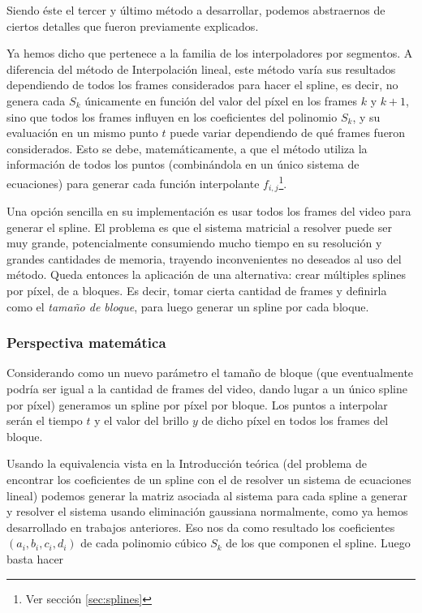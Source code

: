 Siendo \'este el tercer y \'ultimo m\'etodo a desarrollar, podemos abstraernos de ciertos detalles que fueron previamente explicados.

Ya hemos dicho que pertenece a la familia de los interpoladores por segmentos. A diferencia del m\'etodo de Interpolaci\'on lineal, este método varía sus resultados dependiendo de todos los frames considerados para hacer el spline, es decir, no genera cada $S_k$ únicamente en función del valor del píxel en los frames $k$ y $k+1$, sino que todos los frames influyen en los coeficientes del polinomio $S_k$, y su evaluación en un mismo punto $t$ puede variar dependiendo de qué frames fueron considerados. Esto se debe, matemáticamente, a que el método utiliza la información de todos los puntos (combinándola en un único sistema de ecuaciones) para generar cada función interpolante $f_{i,j}$\footnote{Ver sección \ref{sec:splines}}.

Una opción sencilla en su implementación es usar todos los frames del video para generar el spline. El problema es que el sistema matricial a resolver puede ser muy grande, potencialmente consumiendo mucho tiempo en su resolución y grandes cantidades de memoria, trayendo inconvenientes no deseados al uso del método. Queda entonces la aplicación de una alternativa: crear múltiples splines por píxel, de a bloques. Es decir, tomar cierta cantidad de frames y definirla como el \textit{tamaño de bloque}, para luego generar un spline por cada bloque.

\subsubsection*{\bf{Perspectiva matem\'atica}}
Considerando como un nuevo parámetro el tamaño de bloque (que eventualmente podría ser igual a la cantidad de frames del video, dando lugar a un único spline por píxel) generamos un spline por píxel por bloque. Los puntos a interpolar serán el tiempo $t$ y el valor del brillo $y$ de dicho píxel en todos los frames del bloque.

Usando la equivalencia vista en la Introducción teórica (del problema de encontrar los coeficientes de un spline con el de resolver un sistema de ecuaciones lineal) podemos generar la matriz asociada al sistema para cada spline a generar y resolver el sistema usando eliminación gaussiana normalmente, como ya hemos desarrollado en trabajos anteriores. Eso nos da como resultado los coeficientes $(a_i,b_i,c_i,d_i)$ de cada polinomio cúbico $S_k$ de los que componen el spline. Luego basta hacer

